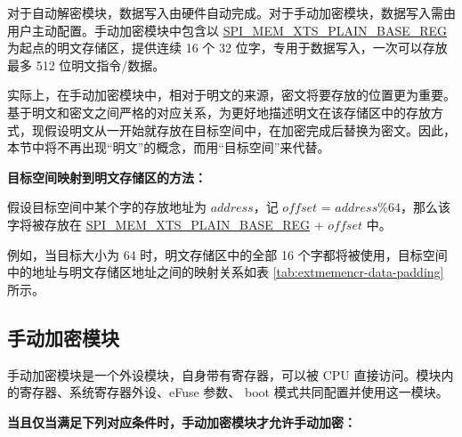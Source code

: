 \documentclass[main\_\_CN.tex]{subfiles}
\begin{document}
对于自动解密模块，数据写入由硬件自动完成。对于手动加密模块，数据写入需由用户主动配置。手动加密模块中包含以 \hyperref[regdesc:SPIMEMXTSPLAINBASEREG]{SPI\_MEM\_XTS\_PLAIN\_BASE\_REG} 为起点的明文存储区，提供连续 16 个 32 位字，专用于数据写入，一次可以存放最多 512 位明文指令/数据。

实际上，在手动加密模块中，相对于明文的来源，密文将要存放的位置更为重要。基于明文和密文之间严格的对应关系，为更好地描述明文在该存储区中的存放方式，现假设明文从一开始就存放在目标空间中，在加密完成后替换为密文。因此，本节中将不再出现“明文”的概念，而用“目标空间”来代替。

{\bfseries 目标空间映射到明文存储区的方法：}

假设目标空间中某个字的存放地址为 \begin{math} address \end{math}，记 \begin{math}offset\end{math} = \begin{math} address \% 64 \end{math}，那么该字将被存放在 \hyperref[regdesc:SPIMEMXTSPLAINBASEREG]{SPI\_MEM\_XTS\_PLAIN\_BASE\_REG} + \begin{math}offset\end{math} 中。

例如，当目标大小为 64 时，明文存储区中的全部 16 个字都将被使用，目标空间中的地址与明文存储区地址之间的映射关系如表 \ref{tab:extmemencr-data-padding} 所示。



\subsection{手动加密模块}

手动加密模块是一个外设模块，自身带有寄存器，可以被 CPU 直接访问。模块内的寄存器、系统寄存器外设、eFuse 参数、 boot 模式共同配置并使用这一模块。

\textbf{当且仅当满足下列对应条件时，手动加密模块才允许手动加密：}
\end{document}

